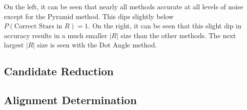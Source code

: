 On the left, it can be seen that nearly all methods accurate at all levels of noise except for the Pyramid method.
This dips slightly below $P(\text{Correct Stars in } R) = 1$.
On the right, it can be seen that this slight dip in accuracy results in a much smaller $\lvert R \rvert$ size than
the other methods.
The next largest $\lvert R \rvert$ size is seen with the Dot Angle method.

\subsection{Candidate Reduction}\label{subsec:candidateReductionResults}


\subsection{Alignment Determination}\label{subsec:alignmentDeterminationResults}


